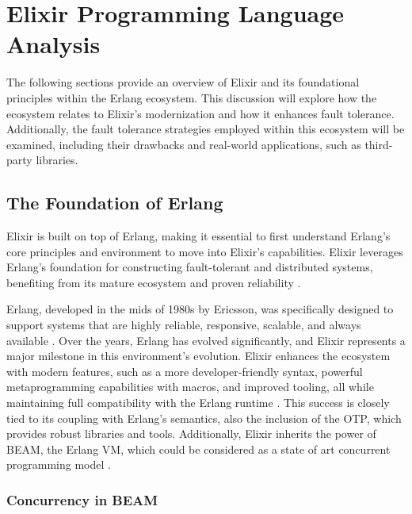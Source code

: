\section{Elixir Programming Language Analysis}

The following sections provide an overview of Elixir and its foundational principles within the Erlang ecosystem. This discussion will explore how the ecosystem relates to Elixir's modernization and how it enhances fault tolerance. Additionally, the fault tolerance strategies employed within this ecosystem will be examined, including their drawbacks and real-world applications, such as third-party libraries.

\subsection{The Foundation of Erlang}

Elixir is built on top of Erlang, making it essential to first understand Erlang’s core principles and environment to move into Elixir’s capabilities. Elixir leverages Erlang’s foundation for constructing fault-tolerant and distributed systems, benefiting from its mature ecosystem and proven reliability \cite{Juric2024,Armstrong2013}.

Erlang, developed in the mids of 1980s by Ericsson, was specifically designed to support systems that are highly reliable, responsive, scalable, and always available \cite{Armstrong2013,Juric2024}. Over the years, Erlang has evolved significantly, and Elixir represents a major milestone in this environment's evolution. Elixir enhances the ecosystem with modern features, such as a more developer-friendly syntax, powerful metaprogramming capabilities with macros, and improved tooling, all while maintaining full compatibility with the Erlang runtime \cite{Juric2024}. This success is closely tied to its coupling with Erlang’s semantics, also the inclusion of the \gls{OTP}, which provides robust libraries and tools. Additionally, Elixir inherits the power of \gls{BEAM}, the Erlang \gls{VM}, which could be considered as a state of art concurrent programming model \cite{erlang-concurrency-blog}.

\subsubsection{Concurrency in BEAM}

